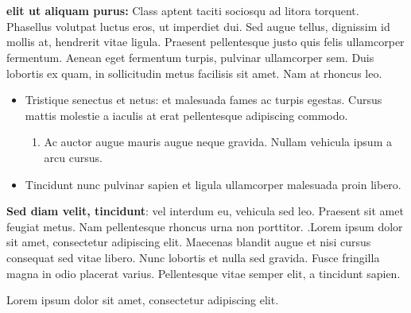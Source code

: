 \documentclass[11pt,a4paper]{report}
\begin{document}
\begin{minipage}[t]{.4\linewidth} %
\noindent
\chapter{}
{\bf elit ut aliquam purus:} Class aptent taciti sociosqu ad litora torquent.
Phasellus volutpat luctus eros, ut imperdiet dui. 
Sed augue tellus, dignissim id mollis at, hendrerit vitae ligula. 
Praesent pellentesque justo quis felis ullamcorper fermentum. 
Aenean eget fermentum turpis, pulvinar ullamcorper sem. 
Duis lobortis ex quam, in sollicitudin metus facilisis sit amet. Nam at rhoncus leo.
\vspace{10pt}
\begin{itemize}
    \item Tristique senectus et netus: et malesuada fames ac turpis egestas.\linebreak
    Cursus mattis molestie a iaculis at erat pellentesque adipiscing commodo.
    \begin{enumerate}
        \item Ac auctor augue mauris augue neque gravida. Nullam vehicula ipsum a arcu cursus.
    \end{enumerate}
    \item Tincidunt nunc pulvinar sapien et ligula ullamcorper malesuada proin libero.
\end{itemize}
\vspace{5pt}

{\bf\large Sed diam velit, tincidunt}: vel interdum eu, vehicula sed leo. 
Praesent sit amet feugiat metus. Nam pellentesque rhoncus urna non porttitor. 
.Lorem ipsum dolor sit amet, consectetur adipiscing elit. 
Maecenas blandit augue et nisi cursus consequat sed vitae libero. 
Nunc lobortis et nulla sed gravida. Fusce fringilla magna in odio placerat varius. 
Pellentesque vitae semper elit, a tincidunt sapien.\linebreak
\begin{center}
Lorem ipsum dolor sit amet, consectetur adipiscing elit.
\end{center}
\end{minipage}
\end{document}

